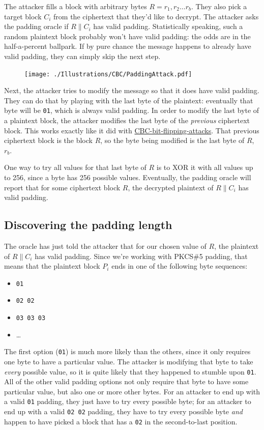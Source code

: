 \documentclass[11pt,ebook,table,dvipsnames]{memoir}
\begin{document}
The attacker fills a block with arbitrary bytes $R = r_1, r_2\ldots
r_b$. They also pick a target block $C_i$ from the ciphertext that
they'd like to decrypt. The attacker asks the padding oracle if $R \|
C_i$ has valid padding. Statistically speaking, such a random
plaintext block probably won't have valid padding: the odds are in the
half-a-percent ballpark. If by pure chance the message happens to
already have valid padding, they can simply skip the next step.

\begin{figure}[ht!]
\centering
\texttt{[image: ./Illustrations/CBC/PaddingAttack.pdf]}
\end{figure}

Next, the attacker tries to modify the message so that it does have
valid padding. They can do that by playing with the last byte of the
plaintext: eventually that byte will be \verb~01~, which is always valid
padding. In order to modify the last byte of a plaintext block, the
attacker modifies the last byte of the \emph{previous} ciphertext block.
This works exactly like it did with \hyperref[CBC bit flipping attacks]{CBC-bit-flipping-attacks}. That
previous ciphertext block is the block $R$, so the byte being modified
is the last byte of $R$, $r_b$.

One way to try all values for that last byte of $R$ is to XOR it with
all values up to 256, since a byte has 256 possible values.
Eventually, the padding oracle will report that for some ciphertext
block $R$, the decrypted plaintext of $R \| C_i$ has valid padding.
\subsection{Discovering the padding length}
\label{sec-2-3-7-2}

The oracle has just told the attacker that for our chosen value of
$R$, the plaintext of $R \| C_i$ has valid padding. Since we're
working with PKCS\#5 padding, that means that the plaintext block $P_i$
ends in one of the following byte sequences:

\begin{itemize}
\item \verb~01~
\item \verb~02 02~
\item \verb~03 03 03~
\item \ldots
\end{itemize}

The first option (\verb~01~) is much more likely than the others, since it
only requires one byte to have a particular value. The attacker is
modifying that byte to take \emph{every} possible value, so it is quite
likely that they happened to stumble upon \verb~01~. All of the other valid
padding options not only require that byte to have some particular
value, but also one or more other bytes. For an attacker to end up
with a valid \verb~01~ padding, they just have to try every possible byte;
for an attacker to end up with a valid \verb~02 02~ padding, they have to
try every possible byte \emph{and} happen to have picked a block that has a
\verb~02~ in the second-to-last position.
\end{document}
